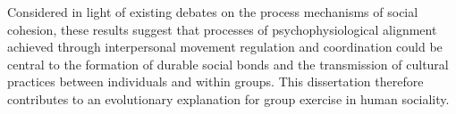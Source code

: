 Considered in light of existing debates on the process mechanisms of social cohesion, these results suggest that processes of psychophysiological alignment achieved through interpersonal movement regulation and coordination could be central to the formation of durable social bonds and the transmission of cultural practices between individuals and within groups.  This dissertation therefore contributes to an evolutionary explanation for group exercise in human sociality.
